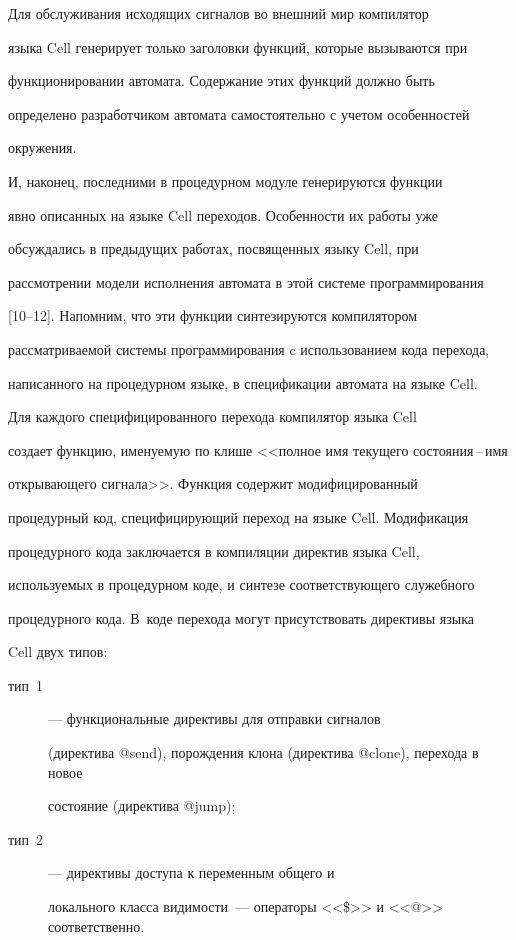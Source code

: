       


      Для обслуживания исходящих сигналов во внешний мир компилятор 


языка Cell генерирует только заголовки функций, которые вызываются при 


функционировании автомата. Содержание этих функций должно быть 


определено разработчиком автомата самостоятельно с учетом особенностей 


окружения.


      


      И, наконец, последними в процедурном модуле генерируются функции 


явно описанных на языке Cell переходов. Особенности их работы уже 


обсуждались в предыдущих работах, посвященных языку Cell, при 


рассмотрении модели исполнения автомата в этой системе программирования 


[10--12]. Напомним, что эти функции синтезируются компилятором 


рассматриваемой системы программирования c использованием кода перехода, 


написанного на процедурном языке, в спецификации автомата на языке Cell.


      


      Для каждого специфицированного перехода компилятор языка Cell 


создает функцию, именуемую по клише <<полное имя текущего состояния\,--\,имя 


открывающего сигнала>>. Функция содержит модифицированный 


процедурный код, специфицирующий переход на языке Cell. Модификация 


процедурного кода заключается в компиляции директив языка Cell, 


используемых в процедурном коде, и синтезе соответствующего служебного 


процедурного кода. В~коде перехода могут присутствовать директивы языка 


Cell двух типов:


      \begin{description}


      \item[тип~1] --- функциональные директивы для отправки сигналов 


(директива @send), порождения клона (директива @clone), перехода в новое 


состояние (директива @jump);


      \item[тип~2] --- директивы доступа к переменным общего и 


локального класса ви\-ди\-мости~--- операторы <<\$>> и <<@>> соответственно.


      \end{description}


